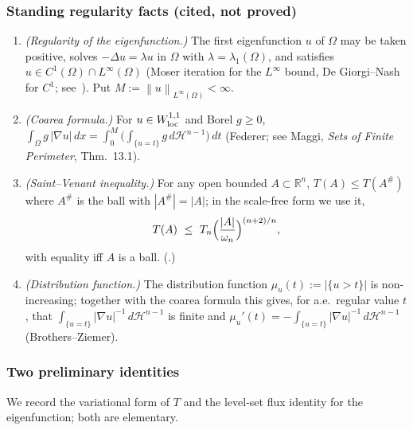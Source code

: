 \documentclass[11pt]{amsart}
\theoremstyle{definition}
\newcommand{\R}{\mathbb R}
\newcommand{\Om}{\Omega}
\newcommand{\HH}{\mathcal H}
\newcommand{\abs}[1]{\left|#1\right|}
\newcommand{\norm}[1]{\left\|#1\right\|}
\newcommand{\dx}{\,dx}
\newcommand{\dt}{\,dt}
\newcommand{\dH}{\,d\HH^{n-1}}
\begin{document}
\subsubsection*{Standing regularity facts (cited, not proved)}
\begin{enumerate}[label=\textup{(R\arabic*)}]
\item\label{R:reg} \emph{(Regularity of the eigenfunction.)} The first
eigenfunction $u$ of $\Om$ may be taken positive, solves
$-\Delta u=\lambda u$ in $\Om$ with $\lambda=\lambda_1(\Om)$, and satisfies
$u\in C^1(\Om)\cap L^\infty(\Om)$ (Moser iteration for the $L^\infty$ bound,
De Giorgi--Nash for $C^{1}$; see~\cite[Prop.~2.4]{Brasco2014}). Put
$M:=\norm{u}_{L^\infty(\Om)}<\infty$.
\item\label{R:coarea} \emph{(Coarea formula.)} For $u\in W^{1,1}_{\rm loc}$
and Borel $g\ge0$,
$\int_\Om g\,\abs{\nabla u}\dx=\int_0^M\bigl(\int_{\{u=t\}}g\dH\bigr)\dt$
(Federer; see Maggi, \emph{Sets of Finite Perimeter}, Thm.~13.1).
\item\label{R:saint-venant} \emph{(Saint--Venant inequality.)} For any open
bounded $A\subset\R^n$, $T(A)\le T(A^\#)$ where $A^\#$ is the ball with
$\abs{A^\#}=\abs A$; in the scale-free form we use it,
\begin{equation}\label{eq:sv-scale}
  T(A)\ \le\ T_n\Bigl(\frac{\abs A}{\omega_n}\Bigr)^{(n+2)/n},
\end{equation}
with equality iff $A$ is a ball. (\cite[(1.7) with $p=2$]{Brasco2014}.)
\item\label{R:absc} \emph{(Distribution function.)} The distribution
function $\mu_u(t):=\abs{\{u>t\}}$ is non-increasing; together with the
coarea formula this gives, for a.e.\ regular value $t$, that
$\int_{\{u=t\}}\abs{\nabla u}^{-1}\dH$ is finite and
$\mu_u'(t)=-\int_{\{u=t\}}\abs{\nabla u}^{-1}\dH$ (Brothers--Ziemer).
\end{enumerate}

\subsubsection*{Two preliminary identities}

We record the variational form of $T$ and the level-set flux identity for
the eigenfunction; both are elementary.
\end{document}
